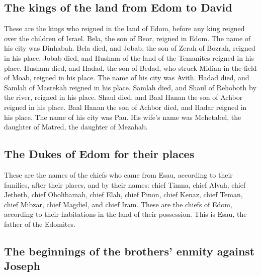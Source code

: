 \hypertarget{the-kings-of-the-land-from-edom-to-david}{%
\subsection{The kings of the land from Edom to
David}\label{the-kings-of-the-land-from-edom-to-david}}

 These are the kings who reigned in the land of Edom,
before any king reigned over the children of Israel. 
Bela, the son of Beor, reigned in Edom. The name of his city was
Dinhabah.  Bela died, and Jobab, the son of Zerah of
Bozrah, reigned in his place.  Jobab died, and Husham of
the land of the Temanites reigned in his place.  Husham
died, and Hadad, the son of Bedad, who struck Midian in the field of
Moab, reigned in his place. The name of his city was Avith.
 Hadad died, and Samlah of Masrekah reigned in his place.
 Samlah died, and Shaul of Rehoboth by the river, reigned
in his place.  Shaul died, and Baal Hanan the son of
Achbor reigned in his place.  Baal Hanan the son of
Achbor died, and Hadar reigned in his place. The name of his city was
Pau. His wife's name was Mehetabel, the daughter of Matred, the daughter
of Mezahab.

\hypertarget{the-dukes-of-edom-for-their-places}{%
\subsection{The Dukes of Edom for their
places}\label{the-dukes-of-edom-for-their-places}}

 These are the names of the chiefs who came from Esau,
according to their families, after their places, and by their names:
chief Timna, chief Alvah, chief Jetheth,  chief
Oholibamah, chief Elah, chief Pinon,  chief Kenaz, chief
Teman, chief Mibzar,  chief Magdiel, and chief Iram.
These are the chiefs of Edom, according to their habitations in the land
of their possession. This is Esau, the father of the Edomites.

\hypertarget{the-beginnings-of-the-brothers-enmity-against-joseph}{%
\subsection{The beginnings of the brothers' enmity against
Joseph}\label{the-beginnings-of-the-brothers-enmity-against-joseph}}

